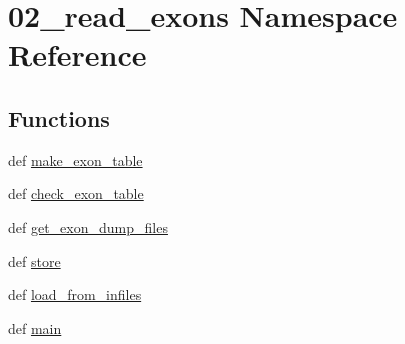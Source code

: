 \hypertarget{namespace02__read__exons}{\section{02\-\_\-read\-\_\-exons Namespace Reference}
\label{namespace02__read__exons}
}
\subsection*{Functions}
\begin{DoxyCompactItemize}
\item 
def \hyperlink{namespace02__read__exons_a15720be202cb298ea6cab1aa8e70d0ca}{make\-\_\-exon\-\_\-table}
\item 
def \hyperlink{namespace02__read__exons_a0b958b1dd2129e8f0a1f1472744766df}{check\-\_\-exon\-\_\-table}
\item 
def \hyperlink{namespace02__read__exons_aa6088e9f00a27e242ff4aa086fd99b5a}{get\-\_\-exon\-\_\-dump\-\_\-files}
\item 
def \hyperlink{namespace02__read__exons_a2979848b8b41cf94dc90fedd40345350}{store}
\item 
def \hyperlink{namespace02__read__exons_ac4ef27ee5d36478e7b32beeace171e36}{load\-\_\-from\-\_\-infiles}
\item 
def \hyperlink{namespace02__read__exons_a18f7b03488d248de294cb85fa2f965fe}{main}
\end{DoxyCompactItemize}


